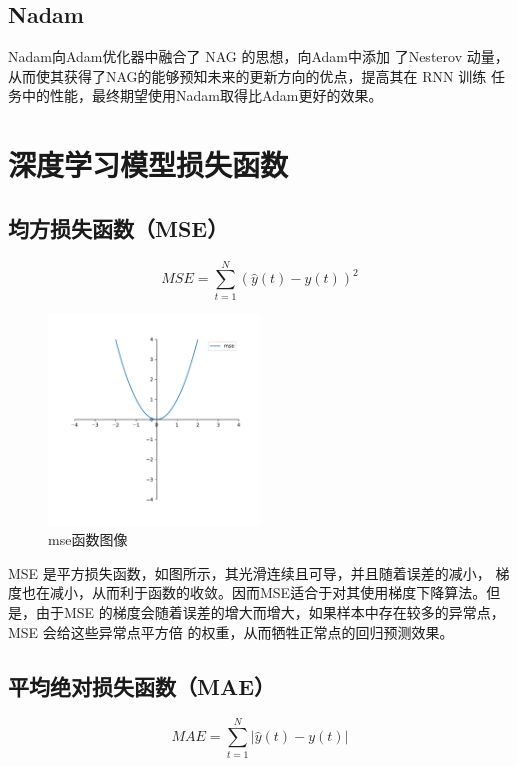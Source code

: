 \documentclass[AutoFakeBold]{LZUThesis}
\begin{document}
\subsection{Nadam}
Nadam\cite{dozat2016incorporating}向Adam优化器中融合了 NAG 的思想，向Adam中添加
了Nesterov 动量，从而使其获得了NAG的能够预知未来的更新方向的优点，提高其在 RNN 训练
任务中的性能，最终期望使用Nadam取得比Adam更好的效果。

\section{深度学习模型损失函数}
\subsection{均方损失函数（MSE）}
$$MSE=\sum_{t=1}^{N}\left(\hat{y}\left(t\right)-y\left(t\right)\right)^2$$

\begin{figure}[H]
	\centering
    \includegraphics[width=0.5\textwidth]{figures/mse.pdf}
    \caption{mse函数图像}
    \label{fig_mse}
\end{figure}

MSE 是平方损失函数，如图\label{fig_mse}所示，其光滑连续且可导，并且随着误差的减小，
梯度也在减小，从而利于函数的收敛。因而MSE适合于对其使用梯度下降算法。但是，由于MSE
的梯度会随着误差的增大而增大，如果样本中存在较多的异常点，MSE 会给这些异常点平方倍
的权重，从而牺牲正常点的回归预测效果。

\subsection{平均绝对损失函数（MAE）}
$$MAE=\sum_{t=1}^{N}\left|\hat{y}\left(t\right)-y\left(t\right)\right|$$
\end{document}

